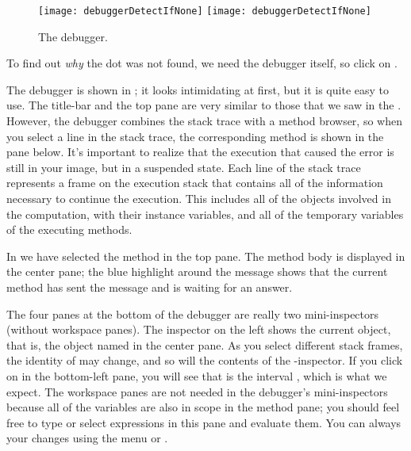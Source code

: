 \documentclass[a4paper,10pt,twoside]{book}
\begin{document}
\begin{figure}[btp]
	\begin{center}
	\ifluluelse
		{\texttt{[image: debuggerDetectIfNone]}}
		{\texttt{[image: debuggerDetectIfNone]}}
	\end{center}
	\caption{The debugger.}
	\label{fig:debuggerDetectIfNone}
\end{figure}

To find out \emph{why} the dot was not found, we need the debugger itself, so click on .


The debugger is shown in ; it looks intimidating at first, but it is quite easy to use.
The title-bar and the top pane are very similar to those that we saw in the .  
However, the debugger combines the stack trace with a method browser, so when you select a line in the stack trace, the corresponding method is shown in the pane below.
It's important to realize that the execution that caused the error is still in your image, but in a suspended state.  
Each line of the stack trace represents a frame on the execution stack that contains all of the information necessary to continue the execution.  This includes all of the objects involved in the computation, with their instance variables, and all of the temporary variables of the executing methods.

In  we have selected the  method in the top pane.
The method body is displayed in the center pane; the blue highlight around the message  shows that the current method has sent the message  and is waiting for an answer.

The four panes at the bottom of the debugger are really two mini-inspectors (without workspace panes).
The inspector on the left shows the current object, that is, the object named \self in the center pane.
As you select different stack frames, the identity of \self may change, and so will the contents of the 
\self{}-inspector.
If you click on \self in the bottom-left pane, you will see that \self is the interval , which is what we expect.
The workspace panes are not needed in the debugger's mini-inspectors because all of the variables are also in scope in the method pane; you should feel free to type or select expressions in this pane and evaluate them.  
You can always  your changes using the menu or . 
\end{document}
